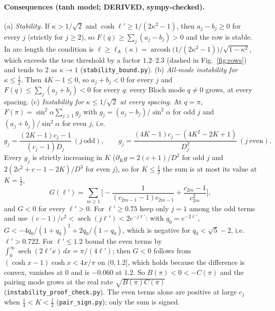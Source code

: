 \documentclass[11pt]{article}
\theoremstyle{remark}
\begin{document}
\paragraph{Consequences (tanh model; DERIVED, sympy-checked).}
(a) \emph{Stability.} If $\kappa>1/\sqrt2$ and $\cosh\ell'\ge1/(2\kappa^2-1)$, then $a_j-b_j\ge0$ for every $j$ (strictly for
$j\ge2$), so $F(q)\ge\sum_j(a_j-b_j)>0$ and the row is stable. In arc length the condition is
$\ell\ge\ell_A(\kappa)=\operatorname{arcosh}\!\big(1/(2\kappa^2-1)\big)/\sqrt{1-\kappa^2}$, which exceeds the true threshold by a
factor $1.2$--$2.3$ (dashed in Fig.~\ref{fig:rows}) and tends to $2$ as $\kappa\to1$ (\texttt{stability\_bound.py}).
(b) \emph{All-mode instability for $\kappa\le\frac12$.} Then $4K-1\le0$, so $a_j+b_j<0$ for every $j$ and
$F(q)\le\sum_j(a_j+b_j)<0$ for every $q$: every Bloch mode $q\ne0$ grows, at every spacing.
(c) \emph{Instability for $\kappa\le1/\sqrt2$ at every spacing.} At $q=\pi$, $F(\pi)=\sin^2\!\alpha\sum_{j\ge1}g_j$ with
$g_j=(a_j-b_j)/\sin^2\alpha$ for odd $j$ and $(a_j+b_j)/\sin^2\alpha$ for even $j$, i.e.
\[
g_j=\frac{(2K-1)c_j-1}{(c_j-1)D_j}\ (j\ \text{odd}),\qquad g_j=\frac{(4K-1)c_j-(4K^2-2K+1)}{D_j^2}\ (j\ \text{even}).
\]
Every $g_j$ is strictly increasing in $K$ ($\partial_Kg=2(c+1)/D^2$ for odd $j$ and $2(2c^2+c-1-2K)/D^3$ for even $j$), so for
$K\le\frac12$ the sum is at most its value at $K=\frac12$,
\[
G(\ell')=\sum_{m\ge1}\Big[-\frac1{(c_{2m-1}-1)c_{2m-1}}+\frac{c_{2m}-1}{c_{2m}^2}\Big],
\]
and $G<0$ for every $\ell'>0$. For $\ell'\ge0.75$ keep only $j=1$ among the odd terms and use $(c-1)/c^2<\operatorname{sech}(j\ell')
<2e^{-j\ell'}$: with $q_0=e^{-2\ell'}$, $G<-4q_0/(1+q_0)^2+2q_0/(1-q_0)$, which is negative for $q_0<\sqrt5-2$, i.e.\ $\ell'>0.722$.
For $\ell'\le1.2$ bound the even terms by $\int_0^\infty\operatorname{sech}(2\ell'x)\,dx=\pi/(4\ell')$; then $G<0$ follows from
$(\cosh x-1)\cosh x<4x/\pi$ on $(0,1.2]$, which holds because the difference is convex, vanishes at $0$ and is $-0.060$ at
$1.2$. So $B(\pi)<0<-C(\pi)$ and the pairing mode grows at the real rate $\sqrt{B(\pi)C(\pi)}$
(\texttt{instability\_proof\_check.py}). The even terms alone are positive at large $c_j$ when $\frac14<K<\frac12$
(\texttt{pair\_sign.py}); only the sum is signed.
\end{document}
